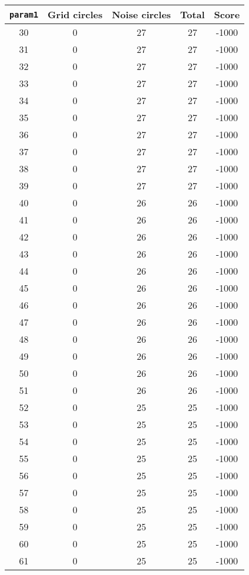\documentclass[letterpaper, 12pt]{article}
\begin{document}
\begin{longtable}{|c|c|c|c|c|}
\hline
\textbf{\texttt{param1}} & \textbf{Grid circles} & \textbf{Noise circles} & \textbf{Total} & \textbf{Score} \\
\hline
30 & 0 & 27 & 27 & -1000 \\
\hline
31 & 0 & 27 & 27 & -1000 \\
\hline
32 & 0 & 27 & 27 & -1000 \\
\hline
33 & 0 & 27 & 27 & -1000 \\
\hline
34 & 0 & 27 & 27 & -1000 \\
\hline
35 & 0 & 27 & 27 & -1000 \\
\hline
36 & 0 & 27 & 27 & -1000 \\
\hline
37 & 0 & 27 & 27 & -1000 \\
\hline
38 & 0 & 27 & 27 & -1000 \\
\hline
39 & 0 & 27 & 27 & -1000 \\
\hline
40 & 0 & 26 & 26 & -1000 \\
\hline
41 & 0 & 26 & 26 & -1000 \\
\hline
42 & 0 & 26 & 26 & -1000 \\
\hline
43 & 0 & 26 & 26 & -1000 \\
\hline
44 & 0 & 26 & 26 & -1000 \\
\hline
45 & 0 & 26 & 26 & -1000 \\
\hline
46 & 0 & 26 & 26 & -1000 \\
\hline
47 & 0 & 26 & 26 & -1000 \\
\hline
48 & 0 & 26 & 26 & -1000 \\
\hline
49 & 0 & 26 & 26 & -1000 \\
\hline
50 & 0 & 26 & 26 & -1000 \\
\hline
51 & 0 & 26 & 26 & -1000 \\
\hline
52 & 0 & 25 & 25 & -1000 \\
\hline
53 & 0 & 25 & 25 & -1000 \\
\hline
54 & 0 & 25 & 25 & -1000 \\
\hline
55 & 0 & 25 & 25 & -1000 \\
\hline
56 & 0 & 25 & 25 & -1000 \\
\hline
57 & 0 & 25 & 25 & -1000 \\
\hline
58 & 0 & 25 & 25 & -1000 \\
\hline
59 & 0 & 25 & 25 & -1000 \\
\hline
60 & 0 & 25 & 25 & -1000 \\
\hline
61 & 0 & 25 & 25 & -1000 \\

\end{longtable}
\end{document}
